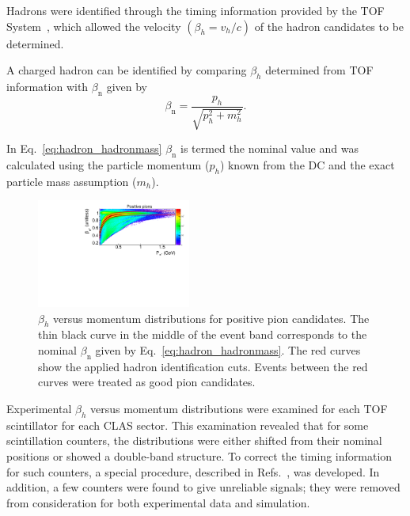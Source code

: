 \documentclass[prc,twocolumn,superscriptaddress,showpacs,amssymb,amsmath,amsfonts,aps,nofootinbib]{revtex4-1}
\begin{document}
Hadrons were identified through the timing information provided by the TOF System~\cite{Smith:1999ii, clas_tof_paddles}, which allowed the velocity $(\beta_{h} = v_{h}/c)$ of the hadron candidates to be determined.

A charged hadron can be identified by comparing $\beta_{h}$ determined from TOF information with $\beta_{\text{n}}$ given by 
\begin{equation}
\beta_{\text{n}}=\frac{p_{h}}{\sqrt{p_{h}^{2}+m_{h}^{2}}}.
\label{eq:hadron_hadronmass}
\end{equation}

In Eq.\!~\eqref{eq:hadron_hadronmass} $\beta_{\text{n}}$ is termed the nominal value and was calculated using the particle momentum ($p_{h}$) known from the DC and the exact particle mass assumption ($m_{h}$).

\begin{figure}[htp]
\begin{center}
 \includegraphics[width=0.45\textwidth,keepaspectratio]{pictures/event_selection/hadron_id_cuts.pdf}
\caption{$\beta_{h}$ versus momentum distributions for positive pion candidates. The thin black curve in the middle of the event band corresponds to the nominal $\beta_{\text{n}}$ given by Eq.\!~\eqref{eq:hadron_hadronmass}. The red curves show the applied hadron identification cuts. Events between the red curves were treated as good pion candidates. }
\label{fig:hadron_id}
\end{center}
\end{figure}

Experimental $\beta_{h}$ versus momentum distributions were examined for each TOF scintillator for each CLAS sector. This examination revealed that for some scintillation counters, the distributions were either shifted from their nominal positions or showed a double-band structure. To correct the timing information for such counters, a special procedure, described in Refs.\!~\cite{my_an_note:2020, my_thesis:2021}, was developed. In addition, a few counters were found to give unreliable signals; they were removed from consideration for both experimental data and simulation.
\end{document}
